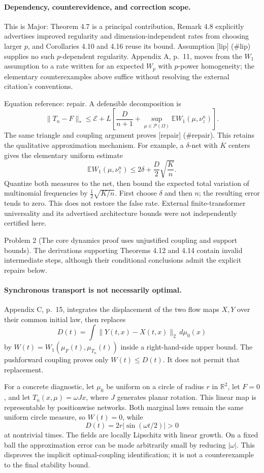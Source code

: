 \documentclass[10pt]{article}
\begin{document}
\paragraph*{Dependency, counterevidence, and correction scope.}\mbox{}\par
This is Major: Theorem 4.7 is a principal contribution, Remark 4.8 explicitly advertises improved regularity and dimension-independent rates from choosing larger \(p\), and Corollaries 4.10 and 4.16 reuse its bound. Assumption [lip] (\#lip) supplies no such \(p\)-dependent regularity. Appendix A, p. 11, moves from the \(W_1\) assumption to a rate written for an expected \(W_p\) with \(p\)-power homogeneity; the elementary counterexamples above suffice without resolving the external citation’s conventions.\par
Equation reference: repair. A defensible decomposition is \[
 \|T_n-F\|_*\le\mathcal E+
 L\left[\frac D{n+1}
 +\sup_{\mu\in\mathcal P(\Omega)}
 \mathbb E W_1(\mu,\nu_z^n)\right].\] The same triangle and coupling argument proves [repair] (\#repair). This retains the qualitative approximation mechanism. For example, a \(\delta\)-net with \(K\) centers gives the elementary uniform estimate \[\mathbb E W_1(\mu,\nu_z^n)
 \le 2\delta+\frac D2\sqrt{\frac Kn}.\] Quantize both measures to the net, then bound the expected total variation of multinomial frequencies by \(\frac12\sqrt{K/n}\). First choose \(\delta\) and then \(n\); the resulting error tends to zero. This does not restore the false rate. External finite-transformer universality and its advertised architecture bounds were not independently certified here.\par
Problem 2 (The core dynamics proof uses unjustified coupling and support bounds).  The derivations supporting Theorems 4.12 and 4.14 contain invalid intermediate steps, although their conditional conclusions admit the explicit repairs below.\par
\paragraph*{Synchronous transport is not necessarily optimal.}\mbox{}\par
Appendix C, p. 15, integrates the displacement of the two flow maps \(X,Y\) over their common initial law, then replaces \[D(t)=\int\|Y(t,x)-X(t,x)\|_2\,d\mu_0(x)\] by \(W(t)=W_1(\mu_F(t),\mu_{T_n}(t))\) inside a right-hand-side upper bound. The pushforward coupling proves only \(W(t)\le D(t)\). It does not permit that replacement.\par
For a concrete diagnostic, let \(\mu_0\) be uniform on a circle of radius \(r\) in \(\mathbb R^2\), let \(F=0\), and let \(T_n(x,\mu)=\omega Jx\), where \(J\) generates planar rotation. This linear map is representable by positionwise networks. Both marginal laws remain the same uniform circle measure, so \(W(t)=0\), while \[D(t)=2r|\sin(\omega t/2)|>0\] at nontrivial times. The fields are locally Lipschitz with linear growth. On a fixed ball the approximation error can be made arbitrarily small by reducing \(|\omega|\). This disproves the implicit optimal-coupling identification; it is not a counterexample to the final stability bound.\par
\end{document}
